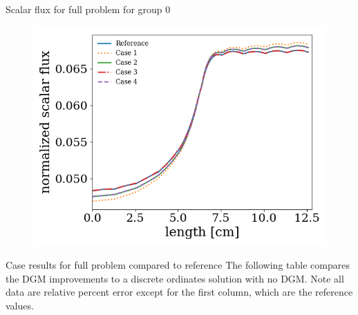 \documentclass[final]{beamer}
\begin{document}
\begin{frame}{}
\begin{columns}[t]
\begin{column}{.32\linewidth}
\begin{block}{Scalar flux for full problem for group 0}
\begin{figure}[htb]
                    \includegraphics[scale=1.0, width=0.9\columnwidth]{phi_g0_o59}
                \end{figure}
            \end{block}
            \vspace{0.1eX}
            \begin{block}{Case results for full problem compared to reference}
                \centering
                The following table compares the DGM improvements to a discrete ordinates solution with no DGM.
                Note all data are relative percent error except for the first column, which are the reference values.
                \vspace{2eX}
                

\end{block}
\end{column}
\end{columns}
\end{frame}
\end{document}
